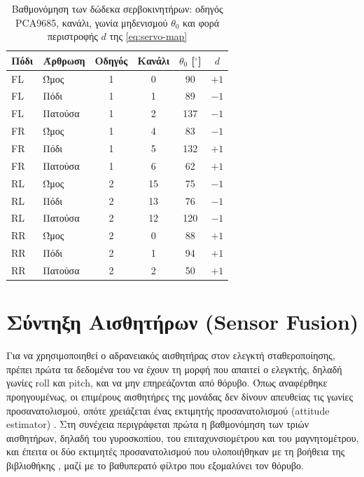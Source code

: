 \documentclass[11pt]{report}
\begin{document}
\begin{table}[htbp]
    \centering
    \small
    \begin{tabular}{@{}l l c c c c@{}}
        \toprule
        Πόδι & Άρθρωση & Οδηγός & Κανάλι & $\theta_0$ [$^\circ$] & $d$ \\
        \midrule
        FL & Ώμος & 1 & 0 & 90 & $+1$ \\
        FL & Πόδι & 1 & 1 & 89 & $-1$ \\
        FL & Πατούσα & 1 & 2 & 137 & $-1$ \\
        \midrule
        FR & Ώμος & 1 & 4 & 83 & $-1$ \\
        FR & Πόδι & 1 & 5 & 132 & $+1$ \\
        FR & Πατούσα & 1 & 6 & 62 & $+1$ \\
        \midrule
        RL & Ώμος & 2 & 15 & 75 & $-1$ \\
        RL & Πόδι & 2 & 13 & 76 & $-1$ \\
        RL & Πατούσα & 2 & 12 & 120 & $-1$ \\
        \midrule
        RR & Ώμος & 2 & 0 & 88 & $+1$ \\
        RR & Πόδι & 2 & 1 & 94 & $+1$ \\
        RR & Πατούσα & 2 & 2 & 50 & $+1$ \\
        \bottomrule
    \end{tabular}
    \caption[Βαθμονόμηση σερβοκινητήρων]{Βαθμονόμηση των δώδεκα
    σερβοκινητήρων: οδηγός PCA9685, κανάλι, γωνία μηδενισμού $\theta_0$ και
    φορά περιστροφής $d$ της \eqref{eq:servo-map}}
    \label{tab:servo-calib-offsets}
\end{table}

\section{Σύντηξη Αισθητήρων (Sensor Fusion)}
\label{sec:sensor-fusion}
Για να χρησιμοποιηθεί ο αδρανειακός αισθητήρας στον ελεγκτή σταθεροποίησης,
πρέπει πρώτα τα δεδομένα του να έχουν τη μορφή που απαιτεί ο ελεγκτής, δηλαδή
γωνίες roll και pitch, και να μην επηρεάζονται από θόρυβο. Όπως αναφέρθηκε
προηγουμένως, οι επιμέρους αισθητήρες της μονάδας δεν δίνουν απευθείας τις
γωνίες προσανατολισμού, οπότε χρειάζεται ένας εκτιμητής προσανατολισμού
(attitude estimator) \cite{cocoli_comparative_2023}. Στη συνέχεια περιγράφεται
πρώτα η βαθμονόμηση των τριών αισθητήρων, δηλαδή του γυροσκοπίου, του
επιταχυνσιομέτρου και του μαγνητομέτρου, και έπειτα οι δύο εκτιμητές
προσανατολισμού που υλοποιήθηκαν με τη βοήθεια της βιβλιοθήκης
\cite{garcia_ahrs}, μαζί με το βαθυπερατό φίλτρο που εξομαλύνει τον θόρυβο.
\end{document}
